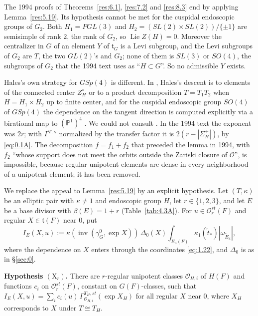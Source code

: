 \documentclass[12pt,letterpaper]{amsart}
\theoremstyle{plain}
\theoremstyle{definition}
\theoremstyle{remark}
\theoremstyle{definition}
\DeclareMathOperator{\inv}{inv}
\DeclareMathOperator{\Lie}{Lie}
\begin{document}
\begin{rem26}\label{rem:main-gap}
The 1994 proofs of Theorems~\ref{res:6.1}, \ref{res:7.2} and \ref{res:8.3}
end by applying Lemma~\ref{res:5.19}. Its hypothesis cannot be met for the
cuspidal endoscopic groups of $G_2$. Both $H_1=PGL(3)$ and
$H_2=(SL(2)\times SL(2))/\{\pm1\}$ are semisimple of rank $2$, the rank of
$G_2$, so $\Lie Z(H)=0$. Moreover the centralizer in $G$ of an element $Y$ of
$\mathfrak t_G$ is a Levi subgroup, and the Levi subgroups of $G_2$ are $T$,
the two $GL(2)$'s and $G_2$; none of them is $SL(3)$ or $SO(4)$, the
subgroups of $G_2$ that the 1994 text uses as ``$H\subset G$''. So no
admissible $Y$ exists.

Hales's own strategy for $GSp(4)$ is different. In \cite[\S2, Prop.~2.4(1), Prop.~2.11 and Prop.~2.14, pp.~199--204]{Ha89},
Hales's descent is to elements of the connected center $Z_H^\circ$ or to a
product decomposition $T=T_1T_2$ when $H=H_1\times H_2$ up to finite center, and
for the cuspidal endoscopic group $SO(4)$ of $GSp(4)$ the dependence on the
tangent direction is computed explicitly via a birational map to $(\mathbb{P}^1)^4$
\cite[\S6, pp.~239--243]{Ha89}. We could not
consult \cite{Ha92b}. In the 1994 text the exponent was $2r$; with
$\Gamma^{T,\kappa}$ normalized by the transfer factor it is
$2(r-|\Sigma_H^+|)$, by \eqref{eq:0.1A}. The decomposition $f=f_1+f_2$ that
preceded the lemma in 1994, with $f_2$ ``whose support does not meet the
orbits outside the Zariski closure of $\mathcal O$'', is impossible, because
regular unipotent elements are dense in every neighborhood of a unipotent
element; it has been removed.

We replace the appeal to Lemma~\ref{res:5.19} by an explicit hypothesis.
Let $(T,\kappa)$ be an elliptic pair with $\kappa\neq1$ and endoscopic
group $H$, let $r\in\{1,2,3\}$, and let $E$ be a base divisor with
$\beta(E)=1+r$ (Table~\ref{tab:4.3A}). For $u\in\mathcal O_r^{st}(F)$ and
regular $X\in\mathfrak t(F)$ near $0$, put
\[
I_E(X,u):=\kappa(\inv(\gamma_G^0,\exp X))\,\Delta_0(X)
\int_{\tilde E_u(F)}\kappa_1(\tilde t_*)|\omega_{\tilde E_u}|,
\]
where the dependence on $X$ enters through the coordinates
\eqref{eq:1.22}, and $\Delta_0$ is as in \S\ref{sec:0}.

\smallskip\noindent
\textbf{Hypothesis $(\mathrm X_r)$.} There are $r$-regular unipotent classes
$\mathcal O_{H,i}$ of $H(F)$ and functions $c_i$ on $\mathcal O_r^{st}(F)$,
constant on $G(F)$-classes, such that
$I_E(X,u)=\sum_i c_i(u)\,\Gamma^{T_H,st}_{\mathcal O_{H,i}}(\exp X_H)$ for all
regular $X$ near $0$, where $X_H$ corresponds to $X$ under $T\cong T_H$.


\end{rem26}
\end{document}
